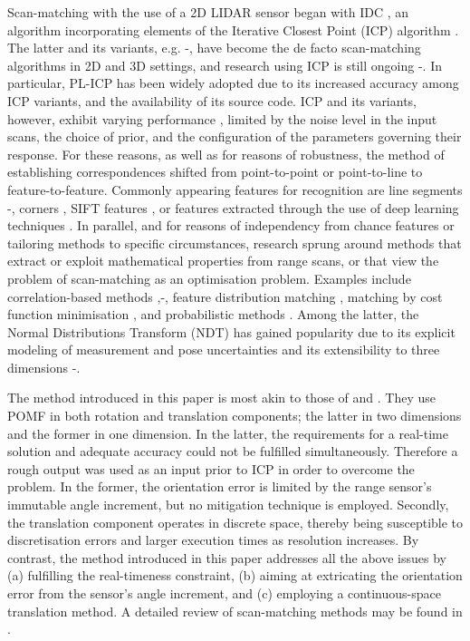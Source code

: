 Scan-matching with the use of a 2D LIDAR sensor began with IDC \cite{LuMilios},
an algorithm incorporating elements of the Iterative Closest Point (ICP)
algorithm \cite{ICP}. The latter and its variants, e.g.
\cite{weighted}-\cite{plicp}, have become the de facto scan-matching algorithms
in 2D and 3D settings, and research using ICP is still ongoing
\cite{ICP_var_1}-\cite{Marchel}. In particular, PL-ICP \cite{plicp} has been
widely adopted due to its increased accuracy among ICP variants, and the
availability of its source code. ICP and its variants, however, exhibit varying
performance \cite{icp_comp_trade}, limited by the noise level in the input
scans, the choice of prior, and the configuration of the parameters
governing their response. For these reasons, as well as for reasons of
robustness, the method of establishing correspondences shifted from
point-to-point or point-to-line to feature-to-feature. Commonly appearing
features for recognition are line segments \cite{CLS}-\cite{Wen}, corners
\cite{wang}, SIFT features \cite{Jiayuan}, or features extracted through the
use of deep learning techniques \cite{Jiaxin}\cite{li}. In parallel, and for
reasons of independency from chance features or tailoring methods to specific
circumstances, research sprung around methods that extract or exploit
mathematical properties from range scans, or that view the problem of
scan-matching as an optimisation problem. Examples include correlation-based
methods \cite{olson},\cite{olson_2015}-\cite{Konecny}, feature distribution
matching \cite{HSM}, matching by cost function minimisation \cite{PB_PSM}, and
probabilistic methods \cite{pIC}\cite{gpm}. Among the latter, the Normal
Distributions Transform (NDT) \cite{ndt1} has gained popularity due to its
explicit modeling of measurement and pose uncertainties and its extensibility
to three dimensions \cite{ndt2}-\cite{ndt7}.

The method introduced in this paper is most akin to those of \cite{Heng} and
\cite{Jiang}. They use POMF \cite{fmt2d} in both rotation and translation
components; the latter in two dimensions and the former in one dimension. In
the latter, the requirements for a real-time solution and adequate accuracy
could not be fulfilled simultaneously. Therefore a rough output was used as an
input prior to ICP in order to overcome the problem. In the former, the
orientation error is limited by the range sensor's immutable angle increment,
but no mitigation technique is employed. Secondly, the translation component
operates in discrete space, thereby being susceptible to discretisation errors
and larger execution times as resolution increases. By contrast, the method
introduced in this paper addresses all the above issues by (a) fulfilling the
real-timeness constraint, (b) aiming at extricating the orientation error from
the sensor's angle increment, and (c) employing a continuous-space translation
method. A detailed review of scan-matching methods may be found in
\cite{pose_selection}.
